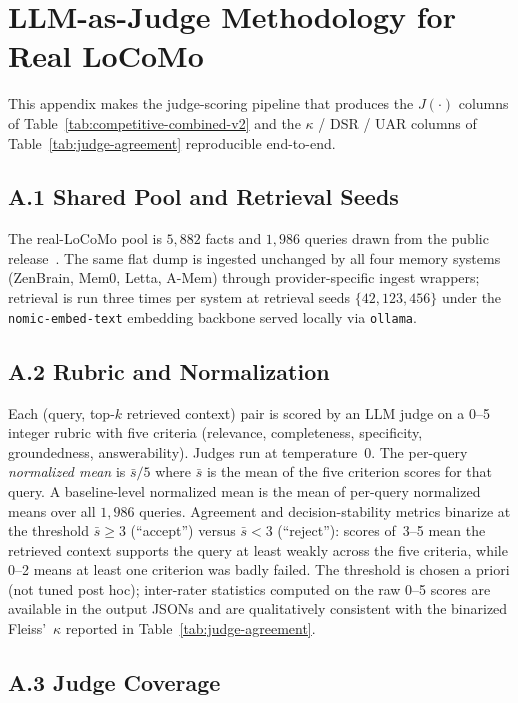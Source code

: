 \documentclass{article}
\begin{document}
\section{LLM-as-Judge Methodology for Real LoCoMo}
\label{app:judge-methodology}

This appendix makes the judge-scoring pipeline that produces the
$J(\cdot)$ columns of Table~\ref{tab:competitive-combined-v2} and
the $\kappa$ / DSR / UAR columns of Table~\ref{tab:judge-agreement}
reproducible end-to-end.

\subsection*{A.1 Shared Pool and Retrieval Seeds}

The real-LoCoMo pool is $5{,}882$ facts and $1{,}986$ queries
drawn from the public release~\citep{maharana2024locomo}.
The same flat dump is ingested unchanged by all four memory systems
(ZenBrain, Mem0, Letta, A-Mem)
through provider-specific ingest wrappers;
retrieval is run three times per system at retrieval seeds
$\{42, 123, 456\}$ under the \texttt{nomic-embed-text} embedding
backbone served locally via \texttt{ollama}.

\subsection*{A.2 Rubric and Normalization}

Each (query, top-$k$ retrieved context) pair is scored by an LLM
judge on a 0--5 integer rubric with five criteria
(relevance, completeness, specificity, groundedness, answerability).
Judges run at temperature~0.
The per-query \emph{normalized mean} is $\bar{s} / 5$ where
$\bar{s}$ is the mean of the five criterion scores for that query.
A baseline-level normalized mean is the mean of per-query
normalized means over all $1{,}986$ queries.
Agreement and decision-stability metrics binarize at the threshold
$\bar{s} \geq 3$ (``accept'') versus $\bar{s} < 3$ (``reject''):
scores of~3--5 mean the retrieved context supports the query at least
weakly across the five criteria, while 0--2 means at least one
criterion was badly failed. The threshold is chosen a priori
(not tuned post hoc); inter-rater statistics computed on the raw
0--5 scores are available in the output JSONs and are qualitatively
consistent with the binarized Fleiss'~$\kappa$ reported in
Table~\ref{tab:judge-agreement}.

\subsection*{A.3 Judge Coverage}
\end{document}
